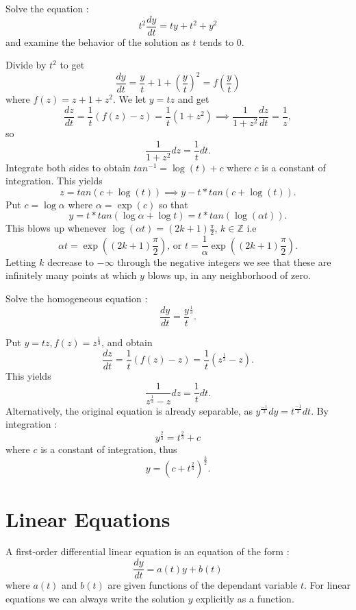 \bigskip

\begin{example} Solve the equation : $$t^2\frac{dy}{dt} = ty + t^2 + y^2$$ and examine the behavior of the solution as $t$ tends to 0. 

\begin{solution} Divide by $t^2$ to get $$\frac{dy}{dt} = \frac{y}{t} + 1 +(\frac{y}{t})^2 = f(\frac{y}{t})$$ where $f(z) = z + 1 + z^2$. We let $y = tz$ and get $$\frac{dz}{dt} = \frac{1}{t}(f(z)-z) = \frac{1}{t}(1+z^2)\implies \frac{1}{1+z^2}\frac{dz}{dt} = \frac{1}{z},$$
so $$\frac{1}{1 +z^2}dz = \frac{1}{t}dt.$$
Integrate both sides to obtain $tan^{-1} = \log(t) + c$ where $c$ is a constant of integration. This yields $$z = tan(c + \log(t)) \implies y - t*tan(c+\log(t)).$$
Put $c = \log\alpha$ where $\alpha = \exp(c)$ so that $$y = t*tan(\log\alpha + \log t) = t*tan(\log(\alpha t )).$$ This blows up whenever $\log(\alpha t) = (2k + 1)\frac{\pi}{2}$, $k\in \mathbb{Z}$ i.e $$\alpha t = \exp((2k + 1)\frac{\pi}{2}) \mbox{,} \mbox{ or } t = \frac{1}{\alpha}\exp((2k + 1)\frac{\pi}{2}).$$
Letting $k$ decrease to $-\infty$ through the negative integers we see that these are infinitely many points at which $y$ blows up, in any neighborhood of zero. 
\end{solution}
\end{example}

\bigskip

\begin{example}  Solve the homogeneous equation : $$\frac{dy}{dt} = \frac{y}{t}^{\frac{1}{3}}.$$
\begin{solution} Put $y = tz, f(z) = z^{\frac{1}{3}}$, and obtain $$\frac{dz}{dt} = \frac{1}{t}(f(z) - z) = \frac{1}{t}(z^{\frac{1}{3}} - z).$$ This yields $$\frac{1}{z^\frac{1}{3} - z}dz = \frac{1}{t}dt.$$
Alternatively, the original equation is already separable, as $y^{\frac{-1}{3}}dy = t^\frac{-1}{3}dt$. By integration : $$y^\frac{2}{3} = t^\frac{2}{3} + c$$ where $c$ is a constant of integration, thus $$ y = (c + t^\frac{2}{3})^\frac{3}{2}.$$
\end{solution}
\end{example}

\section{Linear Equations}
A first-order differential linear equation is an equation of the form : $$\frac{dy}{dt} = a(t)y+b(t)$$ where $a(t)$ and $b(t)$ are given functions of the dependant variable $t$. For linear equations we can always write the solution $y$ explicitly as a function.

